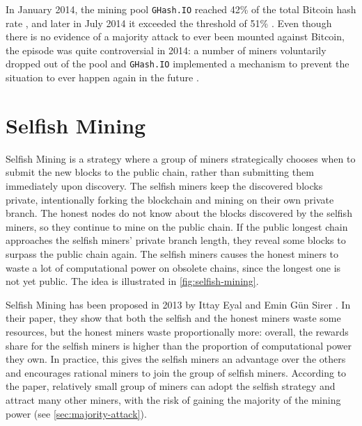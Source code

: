 \pagebreak

In January 2014, the mining pool \texttt{GHash.IO} reached \num{42}\% of the total Bitcoin hash rate \cite{ghash_fears_51_attack, security_survey_2017}, and later in July 2014 it exceeded the threshold of \num{51}\% \cite{wikipedia_ghash, majority_investopedia, bitcoin_wiki_irreversible_transactions}.
Even though there is no evidence of a majority attack to ever been mounted against Bitcoin, the episode was quite controversial in 2014:
a number of miners voluntarily dropped out of the pool and \texttt{GHash.IO} implemented a mechanism to prevent the situation to ever happen again in the future \cite{ghash_51_percent_extremetech, ghash_commits_to_40_percent_coindesk, ghash_commits_to_40_percent_arstechnica}.


\section{Selfish Mining}
Selfish Mining \cite{selfish_mining_acm} is a strategy where a group of miners strategically chooses when to submit the new blocks to the public chain, rather than submitting them immediately upon discovery.
The selfish miners keep the discovered blocks private, intentionally forking the blockchain and mining on their own private branch.
The honest nodes do not know about the blocks discovered by the selfish miners, so they continue to mine on the public chain.
If the public longest chain approaches the selfish miners' private branch length, they reveal some blocks to surpass the public chain again.
The selfish miners causes the honest miners to waste a lot of computational power on obsolete chains, since the longest one is not yet public.
The idea is illustrated in \cref{fig:selfish-mining}.

Selfish Mining has been proposed in 2013 by Ittay Eyal and Emin G\"un Sirer \cite{selfish_mining}.
In their paper, they show that both the selfish and the honest miners waste some resources, but the honest miners waste proportionally more:
overall, the rewards share for the selfish miners is higher than the proportion of computational power they own.
In practice, this gives the selfish miners an advantage over the others and encourages rational miners to join the group of selfish miners.
According to the paper, relatively small group of miners can adopt the selfish strategy and attract many other miners, with the risk of gaining the majority of the mining power (see \cref{sec:majority-attack}).

